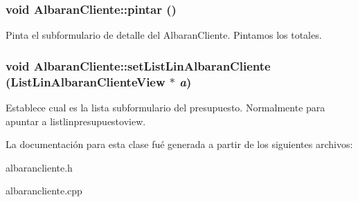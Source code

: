 \subsubsection{\setlength{\rightskip}{0pt plus 5cm}void Albaran\-Cliente::pintar ()\hspace{0.3cm}{\tt  [virtual]}}\label{classAlbaranCliente_a34}


Pinta el subformulario de detalle del Albaran\-Cliente. Pintamos los totales. 
\subsubsection{\setlength{\rightskip}{0pt plus 5cm}void Albaran\-Cliente::set\-List\-Lin\-Albaran\-Cliente ({\bf List\-Lin\-Albaran\-Cliente\-View} $\ast$ {\em a})\hspace{0.3cm}{\tt  [inline]}}\label{classAlbaranCliente_a51}


Establece cual es la lista subformulario del presupuesto. Normalmente para apuntar a listlinpresupuestoview. 

La documentaci\'{o}n para esta clase fu\'{e} generada a partir de los siguientes archivos:\begin{CompactItemize}
\item 
albarancliente.h\item 
albarancliente.cpp\end{CompactItemize}
